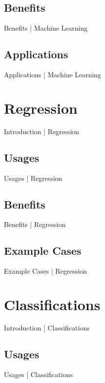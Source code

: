 \documentclass[10pt]{beamer}
\begin{document}
		\subsection{Benefits}
			\begin{frame}{Benefits | Machine Learning}
			\end{frame}
		\subsection{Applications}
			\begin{frame}{Applications | Machine Learning}
			\end{frame}
	
	\section{Regression}
		\begin{frame}{Introduction | Regression}
		\end{frame}
		\subsection{Usages}
			\begin{frame}{Usages | Regression}
			\end{frame}
		\subsection{Benefits}
			\begin{frame}{Benefits | Regression}
			\end{frame}
		\subsection{Example Cases}
			\begin{frame}{Example Cases | Regression}
			\end{frame}
	
	\section{Classifications}
		\begin{frame}{Introduction | Classifications}
		\end{frame}
		\subsection{Usages}
			\begin{frame}{Usages | Classifications}
			\end{frame}
\end{document}
